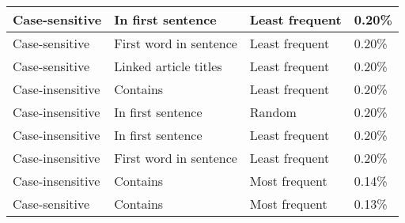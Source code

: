 \begin{center}
\begin{table}[h]
\begin{tabular}{llll}
Case-sensitive       & In first sentence      & Least frequent              & 0.20\%             \\ \hline
Case-sensitive       & First word in sentence & Least frequent              & 0.20\%             \\ \hline
Case-sensitive       & Linked article titles  & Least frequent              & 0.20\%             \\ \hline
Case-insensitive     & Contains               & Least frequent              & 0.20\%             \\ \hline
Case-insensitive     & In first sentence      & Random                      & 0.20\%             \\ \hline
Case-insensitive     & In first sentence      & Least frequent              & 0.20\%             \\ \hline
Case-insensitive     & First word in sentence & Least frequent              & 0.20\%             \\ \hline
Case-insensitive     & Contains               & Most frequent               & 0.14\%             \\ \hline
Case-sensitive       & Contains               & Most frequent               & 0.13\%             \\ \hline
\end{tabular}
\end{table}
\end{center}
